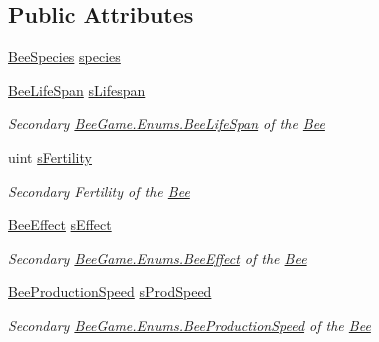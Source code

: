\subsection*{Public Attributes}
\begin{DoxyCompactItemize}
\item 
\hyperlink{namespace_bee_game_1_1_enums_aa2ead984825678d83c42d48f6382619c}{Bee\+Species} \hyperlink{struct_bee_game_1_1_bee_1_1_combining_bee_data_a7e519ea913d51073b7da7815e85a4eeb}{species}
\item 
\hyperlink{namespace_bee_game_1_1_enums_ae3853807ded2f4d99a0d4a7fb4b2bc46}{Bee\+Life\+Span} \hyperlink{struct_bee_game_1_1_bee_1_1_combining_bee_data_a2635fae2aa8e50991d7733624883e671}{s\+Lifespan}
\begin{DoxyCompactList}\small\item\em Secondary \hyperlink{namespace_bee_game_1_1_enums_ae3853807ded2f4d99a0d4a7fb4b2bc46}{Bee\+Game.\+Enums.\+Bee\+Life\+Span} of the \hyperlink{namespace_bee_game_1_1_bee}{Bee} \end{DoxyCompactList}\item 
uint \hyperlink{struct_bee_game_1_1_bee_1_1_combining_bee_data_a02566c65413bebc23e767561c17510d5}{s\+Fertility}
\begin{DoxyCompactList}\small\item\em Secondary Fertility of the \hyperlink{namespace_bee_game_1_1_bee}{Bee} \end{DoxyCompactList}\item 
\hyperlink{namespace_bee_game_1_1_enums_acf7ae32a86385a40fc0c7b55af95c6c3}{Bee\+Effect} \hyperlink{struct_bee_game_1_1_bee_1_1_combining_bee_data_a6706a04242c477e5934d779fde7e7b8e}{s\+Effect}
\begin{DoxyCompactList}\small\item\em Secondary \hyperlink{namespace_bee_game_1_1_enums_acf7ae32a86385a40fc0c7b55af95c6c3}{Bee\+Game.\+Enums.\+Bee\+Effect} of the \hyperlink{namespace_bee_game_1_1_bee}{Bee} \end{DoxyCompactList}\item 
\hyperlink{namespace_bee_game_1_1_enums_afee18200a21cc4b8e1d0cdb669930f14}{Bee\+Production\+Speed} \hyperlink{struct_bee_game_1_1_bee_1_1_combining_bee_data_a253d2a55fe2cb1a3d01492a6f961b995}{s\+Prod\+Speed}
\begin{DoxyCompactList}\small\item\em Secondary \hyperlink{namespace_bee_game_1_1_enums_afee18200a21cc4b8e1d0cdb669930f14}{Bee\+Game.\+Enums.\+Bee\+Production\+Speed} of the \hyperlink{namespace_bee_game_1_1_bee}{Bee} \end{DoxyCompactList}\item 

\end{DoxyCompactItemize}

